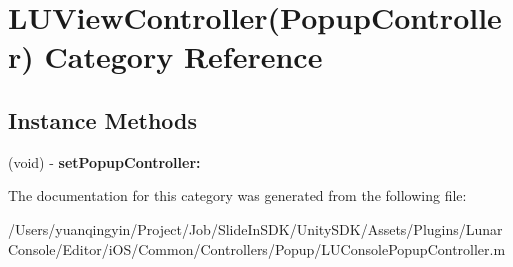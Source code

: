 \hypertarget{category_l_u_view_controller_07_popup_controller_08}{}\section{L\+U\+View\+Controller(Popup\+Controller) Category Reference}
\label{category_l_u_view_controller_07_popup_controller_08}
\subsection*{Instance Methods}
\begin{DoxyCompactItemize}
\item 
\mbox{\label{category_l_u_view_controller_07_popup_controller_08_ac9aafde9f554bd3230243748f744c482}} 
(void) -\/ {\bfseries set\+Popup\+Controller\+:}
\end{DoxyCompactItemize}


The documentation for this category was generated from the following file\+:\begin{DoxyCompactItemize}
\item 
/\+Users/yuanqingyin/\+Project/\+Job/\+Slide\+In\+S\+D\+K/\+Unity\+S\+D\+K/\+Assets/\+Plugins/\+Lunar\+Console/\+Editor/i\+O\+S/\+Common/\+Controllers/\+Popup/L\+U\+Console\+Popup\+Controller.\+m\end{DoxyCompactItemize}

